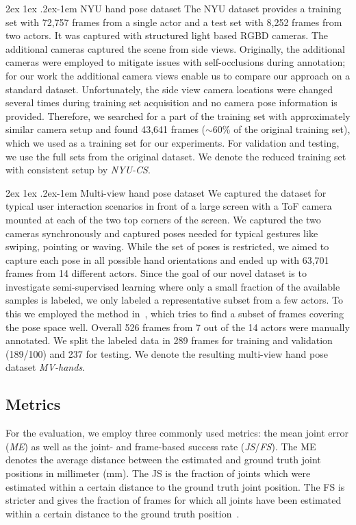 \documentclass[10pt,twocolumn,letterpaper]{article}
\makeatletter
\renewcommand{\paragraph}{%
  \@startsection{paragraph}{4}%
  {\z@}{2ex \@plus 1ex \@minus .2ex}{-1em}%
  {\normalfont\normalsize\bfseries}%
}
\makeatother
\begin{document}
\paragraph{NYU hand pose dataset}
The NYU dataset provides a training set with 72,757 frames from a single actor and 
a test set with 8,252 frames from two actors.
It was captured with structured light based RGBD cameras.
The additional cameras captured the scene from side views.
Originally, the additional cameras were employed to mitigate issues with 
self-occlusions during annotation; for our work the additional camera views
enable us to compare our approach on a standard dataset.
Unfortunately, the side view camera locations were changed several times 
during training set acquisition and no camera pose information is provided.
Therefore, we searched for a part of the training set with approximately 
similar camera setup and found 43,641 frames ($\sim$60\% of the original training set),
which we used as a training set for our experiments.
For validation and testing, we use the full sets from the original dataset.
We denote the reduced training set with consistent setup by \emph{NYU-CS}.

\paragraph{Multi-view hand pose dataset}
We captured the dataset for typical user interaction scenarios in front of 
a large screen with a \acl{ToF} camera mounted at each of the two top corners of the screen.
We captured the two cameras synchronously and 
captured poses needed for typical gestures like swiping, pointing or waving.
While the set of poses is restricted, we aimed to capture each pose in all possible 
hand orientations and ended up with 63,701 frames from 14 different actors.
Since the goal of our novel dataset is to investigate semi-supervised learning 
where only a small fraction of the available samples is labeled,
we only labeled a representative subset from a few actors. 
To this we employed the method in~\cite{Oberweger2016cvpr_anno},
which tries to find a subset of frames covering the pose space well.
Overall 526 frames from 7 out of the 14 actors were manually annotated.
We split the labeled data in 289 frames for training and validation (189/100) and 
237 for testing.
We denote the resulting multi-view hand pose dataset \emph{MV-hands}.

\subsection{Metrics}\label{sec:exp:metrics}
For the evaluation, we employ three commonly used metrics:
the mean joint error (\emph{ME}) as well as the joint- and 
frame-based success rate (\emph{JS}/\emph{FS}).
The ME denotes the average distance between the estimated and 
ground truth joint positions in millimeter (\si{\milli\meter}).
The JS is the fraction of joints which were 
estimated within a certain distance to the ground truth joint 
position.
The FS is stricter and gives the fraction of frames 
for which all joints have been estimated within a certain distance to the ground truth
position~\cite{Taylor2012cvpr_vitruvian}.
\end{document}
